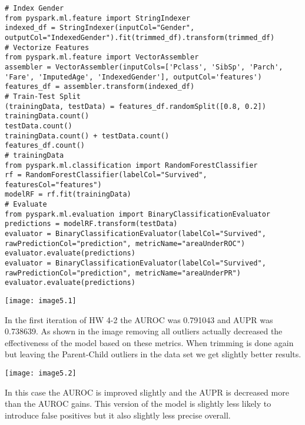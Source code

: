 \documentclass[]{article}
\begin{document}
\begin{verbatim}
# Index Gender
from pyspark.ml.feature import StringIndexer
indexed_df = StringIndexer(inputCol="Gender", outputCol="IndexedGender").fit(trimmed_df).transform(trimmed_df)
# Vectorize Features
from pyspark.ml.feature import VectorAssembler
assembler = VectorAssembler(inputCols=['Pclass', 'SibSp', 'Parch', 'Fare', 'ImputedAge', 'IndexedGender'], outputCol='features')
features_df = assembler.transform(indexed_df)
# Train-Test Split
(trainingData, testData) = features_df.randomSplit([0.8, 0.2])
trainingData.count()
testData.count()
trainingData.count() + testData.count()
features_df.count()
# trainingData
from pyspark.ml.classification import RandomForestClassifier
rf = RandomForestClassifier(labelCol="Survived", featuresCol="features")
modelRF = rf.fit(trainingData)
# Evaluate
from pyspark.ml.evaluation import BinaryClassificationEvaluator
predictions = modelRF.transform(testData)
evaluator = BinaryClassificationEvaluator(labelCol="Survived", rawPredictionCol="prediction", metricName="areaUnderROC")
evaluator.evaluate(predictions)
evaluator = BinaryClassificationEvaluator(labelCol="Survived", rawPredictionCol="prediction", metricName="areaUnderPR")
evaluator.evaluate(predictions)
\end{verbatim}
\texttt{[image: image5.1]}

In the first iteration of HW 4-2 the AUROC was 0.791043 and AUPR was 0.738639.
As shown in the image removing all outliers actually decreased the effectiveness of the model based on these metrics.
When trimming is done again but leaving the Parent-Child outliers in the data set we get slightly better results.

\texttt{[image: image5.2]}

In this case the AUROC is improved slightly and the AUPR is decreased more than the AUROC gains. This version of the model is slightly less likely to introduce false positives but it also slightly less precise overall.
\end{document}
